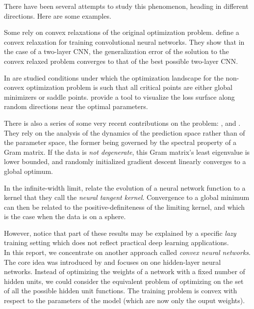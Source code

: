 \documentclass[a4paper, 11pt]{scrartcl}
\begin{document}
{There have been several attempts to study this phenomenon, heading in different directions. Here are some examples.

Some rely on convex relaxations of the original optimization problem. \cite{zhang2016convexified} define a convex relaxation for training convolutional neural networks. They show that in the case of a two-layer CNN, the generalization error of the solution to the convex relaxed problem converges to that of the best possible two-layer CNN.

In \cite{haeffele2017global} are studied conditions under which the optimization landscape for the non-convex optimization problem is such that all critical points are either global minimizers or saddle points. \cite{visualloss} provide a tool to visualize the loss surface along random directions near the optimal parameters.

There is also a series of some very recent contributions on the problem: \cite{du2018agradient}, \cite{du2018bgradient} and \cite{zou2018stochastic}. They rely on the analysis of the dynamics of the prediction space rather than of the parameter space, the former being governed by the spectral property of a Gram matrix. If the data is \textit{not degenerate}, this Gram matrix’s least eigenvalue is lower bounded, and randomly initialized gradient descent linearly converges to a global optimum.

In the infinite-width limit, \cite{jacot2018neural} relate the evolution of a neural network function to a kernel that they call the \textit{neural tangent kernel}. Convergence to a global minimum can then be related to the positive-definiteness of the limiting kernel, and which is the case when the data is on a sphere.

However, \cite{chizat:hal-01945578} notice that part of these results may be explained by a specific \textit{lazy} training setting which does not reflect practical deep learning applications. \\

In this report, we concentrate on another approach called \textit{convex neural networks}. The core idea was introduced by \cite{bengio2006convex} and focuses on one hidden-layer neural networks. Instead of optimizing the weights of a network with a fixed number of hidden units, we could consider the equivalent problem of optimizing on the set of all the possible hidden unit functions. The training problem is convex with respect to the parameters of the model (which are now only the ouput weights).

}
\end{document}
